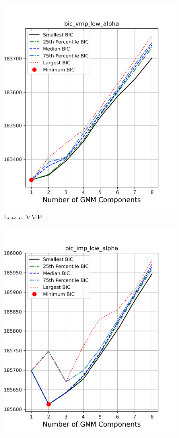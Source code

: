 \documentclass[a4paper,12pt]{article}
\begin{document}
\begin{figure}[htbp]
    \begin{subfigure}[t]{0.24\textwidth}
        \includegraphics[width=\textwidth]{../figures/bic_vmp_low_alpha.png}
        \caption{Low-$\alpha$ VMP}
    \end{subfigure}
    \begin{subfigure}[t]{0.24\textwidth}
        \includegraphics[width=\textwidth]{../figures/bic_imp_low_alpha.png}

\end{subfigure}
\end{figure}
\end{document}
